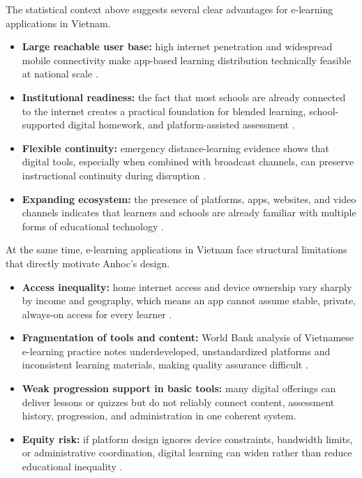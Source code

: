 The statistical context above suggests several clear advantages for e-learning applications in Vietnam.
\begin{itemize}
  \item \textbf{Large reachable user base:} high internet penetration and widespread mobile connectivity make app-based learning distribution technically feasible at national scale \cite{datareportal-vietnam-2025}.
  \item \textbf{Institutional readiness:} the fact that most schools are already connected to the internet creates a practical foundation for blended learning, school-supported digital homework, and platform-assisted assessment \cite{unesco-vietnam-technology}.
  \item \textbf{Flexible continuity:} emergency distance-learning evidence shows that digital tools, especially when combined with broadcast channels, can preserve instructional continuity during disruption \cite{worldbank-vietnam-tv-learning}.
  \item \textbf{Expanding ecosystem:} the presence of platforms, apps, websites, and video channels indicates that learners and schools are already familiar with multiple forms of educational technology \cite{edtechhub-vietnam-scan}.
\end{itemize}

At the same time, e-learning applications in Vietnam face structural limitations that directly motivate Anhoc's design.
\begin{itemize}
  \item \textbf{Access inequality:} home internet access and device ownership vary sharply by income and geography, which means an app cannot assume stable, private, always-on access for every learner \cite{unesco-vietnam-technology,worldbank-vietnam-distance-learning}.
  \item \textbf{Fragmentation of tools and content:} World Bank analysis of Vietnamese e-learning practice notes underdeveloped, unstandardized platforms and inconsistent learning materials, making quality assurance difficult \cite{worldbank-vietnam-distance-learning}.
  \item \textbf{Weak progression support in basic tools:} many digital offerings can deliver lessons or quizzes but do not reliably connect content, assessment history, progression, and administration in one coherent system.
  \item \textbf{Equity risk:} if platform design ignores device constraints, bandwidth limits, or administrative coordination, digital learning can widen rather than reduce educational inequality \cite{unesco-vietnam-technology,worldbank-vietnam-distance-learning}.
\end{itemize}

